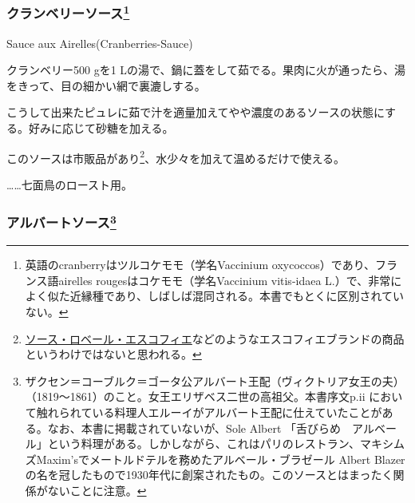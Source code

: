 \begin{recette}

\hypertarget{cranberries-sauce}{%
\subsubsection[クランベリーソース]{\texorpdfstring{クランベリーソース\footnote{英語のcranberryはツルコケモモ（学名Vaccinium
  oxycoccos）であり、フランス語airelles rougesはコケモモ（学名Vaccinium
  vitis-idaea
  L.）で、非常によく似た近縁種であり、しばしば混同される。本書でもとくに区別されていない。}}{クランベリーソース}}\label{cranberries-sauce}}

\begin{frsubenv}

Sauce aux Airelles\hspace{1em}\normalfont(Cranberries-Sauce)

\end{frsubenv}


クランベリー500 gを1
Lの湯で、鍋に蓋をして茹でる。果肉に火が通ったら、湯をきって、目の細かい網で裏漉しする。

こうして出来たピュレに茹で汁を適量加えてやや濃度のあるソースの状態にする。好みに応じて砂糖を加える。

このソースは市販品があり\footnote{\protect\hyperlink{sauce-robert-escoffier}{ソース・ロベール・エスコフィエ}などのようなエスコフィエブランドの商品というわけではないと思われる。}、水少々を加えて温めるだけで使える。

\ldots{}\ldots{}七面鳥のロースト用。

\atoaki{}

\hypertarget{albert-sauce}{%
\subsubsection[アルバートソース]{\texorpdfstring{アルバートソース\footnote{ザクセン＝コーブルク＝ゴータ公アルバート王配（ヴィクトリア女王の夫）（1819〜1861）のこと。女王エリザベス二世の高祖父。本書序文p.ii
  において触れられている料理人エルーイがアルバート王配に仕えていたことがある。なお、本書に掲載されていないが、Sole
  Albert
  「舌びらめ　アルベール」という料理がある。しかしながら、これはパリのレストラン、マキシムズMaxim'sでメートルドテルを務めたアルベール・ブラゼール
  Albert
  Blazerの名を冠したもので1930年代に創案されたもの。このソースとはまったく関係がないことに注意。}}{アルバートソース}}\label{albert-sauce}}


\end{recette}
